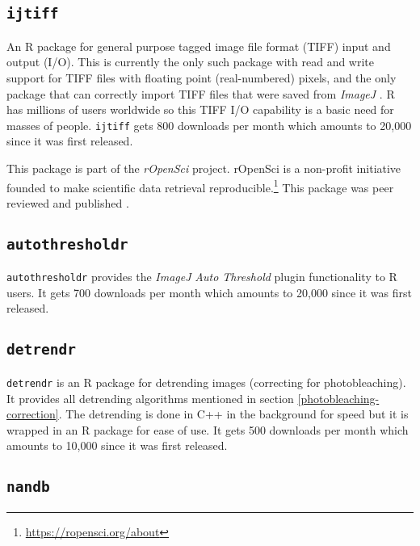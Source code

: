 \documentclass[12pt,]{book}
\let\rmarkdownfootnote\footnote%
\def\footnote{\protect\rmarkdownfootnote}
\theoremstyle{definition}
\theoremstyle{definition}
\theoremstyle{definition}
\theoremstyle{remark}
\begin{document}
\subsection{\texorpdfstring{\texttt{ijtiff}}{ijtiff}}\label{ijtiff}

An R package for general purpose tagged image file format (TIFF) input
and output (I/O). This is currently the only such package with read and
write support for TIFF files with floating point (real-numbered) pixels,
and the only package that can correctly import TIFF files that were
saved from \emph{ImageJ} \citep{ImageJ}. R has millions of users
worldwide so this TIFF I/O capability is a basic need for masses of
people. \texttt{ijtiff} gets 800 downloads per month which amounts to
20,000 since it was first released.

This package is part of the \emph{rOpenSci} project. rOpenSci is a
non-profit initiative founded to make scientific data retrieval
reproducible.\footnote{\url{https://ropensci.org/about}} This package
was peer reviewed and published \citep{ijtiff}.

\subsection{\texorpdfstring{\texttt{autothresholdr}}{autothresholdr}}\label{autothresholdr}

\texttt{autothresholdr} provides the \emph{ImageJ} \citep{ImageJ}
\emph{Auto Threshold} plugin \citep{autothresholdr} functionality to R
users. It gets 700 downloads per month which amounts to 20,000 since it
was first released.

\subsection{\texorpdfstring{\texttt{detrendr}}{detrendr}}\label{detrendr}

\texttt{detrendr} is an R package for detrending images (correcting for
photobleaching). It provides all detrending algorithms mentioned in
section \ref{photobleaching-correction}. The detrending is done in C++
in the background for speed but it is wrapped in an R package for ease
of use. It gets 500 downloads per month which amounts to 10,000 since it
was first released.

\subsection{\texorpdfstring{\texttt{nandb}}{nandb}}\label{nandb}
\end{document}
